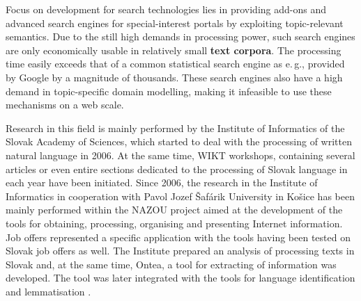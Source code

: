 \begin{multicols}{2}
Focus on development for search technologies lies in providing add-ons and advanced search engines for special-interest portals by exploiting topic-relevant semantics. Due to the still high demands in processing power, such search engines are only economically usable in relatively small \textbf{text corpora}. The processing time easily exceeds that of a common statistical search engine as e.\,g., provided by Google by a magnitude of thousands. These search engines also have a high demand in topic-specific domain modelling, making it infeasible to use these mechanisms on a web scale.

Research in this field is mainly performed by the Institute of Informatics of the Slovak Academy of Sciences, which started to deal with the processing of written natural language in 2006. At the same time, WIKT\cite{f26} workshops, containing several articles or even entire sections dedicated to the processing of Slovak language in each year have been initiated. Since 2006, the research in the Institute of Informatics in cooperation with Pavol Jozef Šafárik University in Košice has been mainly performed within the NAZOU\cite{f27} project aimed at the development of the tools for obtaining, processing, organising and presenting Internet information. Job offers represented a specific application with the tools having been tested on Slovak job offers as well.  The Institute prepared an analysis of processing texts in Slovak \cite{laclavik2007a} and, at the same time, Ontea\cite{f28}, a tool for extracting of information \cite{laclavik2007b,laclavik2009} was developed. The tool was later integrated with the tools for language identification \cite{vojtek2006} and lemmatisation \cite{krajci2007}.


\end{multicols}
